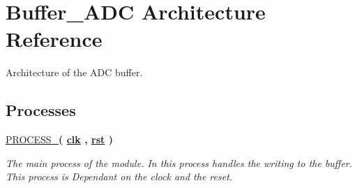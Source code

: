 \hypertarget{classADC__buffer_1_1Buffer__ADC}{\section{Buffer\-\_\-\-A\-D\-C Architecture Reference}
\label{classADC__buffer_1_1Buffer__ADC}
}


Architecture of the A\-D\-C buffer.  


\subsection*{Processes}
 \begin{DoxyCompactItemize}
\item 
\hypertarget{classADC__buffer_1_1Buffer__ADC_a7f0d4cc2572dde6003f96ff6890a2314}{\hyperlink{classADC__buffer_1_1Buffer__ADC_a7f0d4cc2572dde6003f96ff6890a2314}{P\-R\-O\-C\-E\-S\-S\-\_}{\bfseries  ( {\bfseries {\bfseries \hyperlink{classADC__buffer_a8120037e0ee47c35ba2d79242209c72e}{clk}} \textcolor{vhdlchar}{ }\textcolor{vhdlchar}{ }\textcolor{vhdlchar}{ }} , {\bfseries {\bfseries \hyperlink{classADC__buffer_aa7b7040844189161771c36cf6bbf172c}{rst}} \textcolor{vhdlchar}{ }} )}}\label{classADC__buffer_1_1Buffer__ADC_a7f0d4cc2572dde6003f96ff6890a2314}

\begin{DoxyCompactList}\small\item\em The main process of the module. In this process handles the writing to the buffer. This process is Dependant on the clock and the reset. \end{DoxyCompactList}\end{DoxyCompactItemize}

